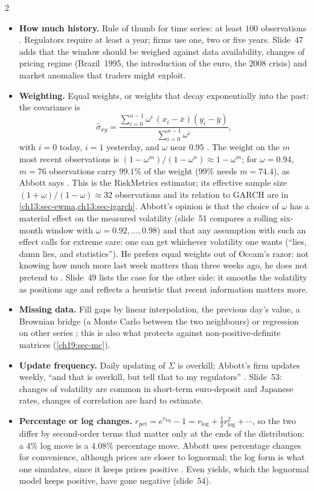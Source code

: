 \begin{paracol}{2}
\begin{itemize}
  \item \textbf{How much history.} Rule of thumb for time series: at least $100$ observations . Regulators require at least a year; firms use one, two or five years. Slide~47 adds that the window should be weighed against data availability, changes of pricing regime (Brazil~1995, the introduction of the euro, the 2008 crisis) and market anomalies that traders might exploit.
  \item \textbf{Weighting.} Equal weights, or weights that decay exponentially into the past: the covariance is
  \[
    \hat\sigma_{xy}=\frac{\sum_{i=0}^{n-1}\omega^i\,(x_i-\bar x)(y_i-\bar y)}{\sum_{i=0}^{n-1}\omega^i},
  \]
  with $i=0$ today, $i=1$ yesterday, and $\omega$ near $0.95$ . The weight on the $m$ most recent observations is $(1-\omega^m)/(1-\omega^n)\approx1-\omega^m$; for $\omega=0.94$, $m=76$ observations carry $99.1\%$ of the weight ($99\%$ needs $m=74.4$), as Abbott says . This is the RiskMetrics estimator; its effective sample size $(1+\omega)/(1-\omega)\approx32$ observations and its relation to GARCH are in \cref{ch13:sec-ewma,ch13:sec-igarch}. Abbott's opinion is that the choice of $\omega$ has a material effect on the measured volatility (slide~51 compares a rolling six-month window with $\omega=0.92,\dots,0.98$) and that any assumption with such an effect calls for extreme care: one can get whichever volatility one wants (``lies, damn lies, and statistics''). He prefers equal weights out of Occam's razor: not knowing how much more last week matters than three weeks ago, he does not pretend to . Slide~49 lists the case for the other side: it smooths the volatility as positions age and reflects a heuristic that recent information matters more.
  \item \textbf{Missing data.} Fill gaps by linear interpolation, the previous day's value, a Brownian bridge (a Monte Carlo between the two neighbours) or regression on other series ; this is also what protects against non-positive-definite matrices (\cref{ch19:sec-mc}).
  \item \textbf{Update frequency.} Daily updating of $\Sigma$ is overkill; Abbott's firm updates weekly, ``and that is overkill, but tell that to my regulators'' . Slide~53: changes of volatility are common in short-term euro-deposit and Japanese rates, changes of correlation are hard to estimate.
  \item \textbf{Percentage or log changes.} $r_{\mathrm{pct}}=e^{r_{\log}}-1=r_{\log}+\tfrac12r_{\log}^2+\cdots$, so the two differ by second-order terms that matter only at the ends of the distribution: a $4\%$ log move is a $4.08\%$ percentage move. Abbott uses percentage changes for convenience, although prices are closer to lognormal; the log form is what one simulates, since it keeps prices positive . Even yields, which the lognormal model keeps positive, have gone negative (slide~54).

\end{itemize}
\end{paracol}
